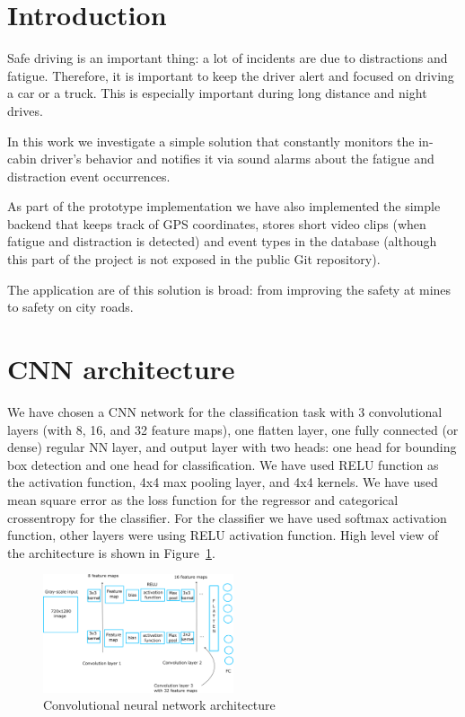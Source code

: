 \section{Introduction}
\label{section:introduction}

Safe driving is an important thing: a lot of incidents are due to 
distractions and fatigue. Therefore, it is important to keep the driver
alert and focused on driving a car or a truck. This is especially important 
during long distance and night drives. 

In this work we investigate a simple solution that constantly monitors 
the in-cabin driver's behavior and notifies it via sound alarms 
about the fatigue and distraction event occurrences. 

As part of the prototype implementation we have also implemented 
the simple backend that keeps track of GPS coordinates, stores 
short video clips (when fatigue and distraction is detected) and event types
in the database (although this part of the project is not exposed in the public 
Git repository).

The application are of this solution is broad: from improving the 
safety at mines to safety on city roads.

\section{CNN architecture}
\label{section:arch}

We have chosen a CNN network for the classification task with 3 convolutional 
layers (with 8, 16, and 32 feature maps), one flatten layer, one fully 
connected (or dense) regular NN layer, and output layer with two heads: one head for 
bounding box detection and one head for classification. We have used RELU function 
as the activation function, 4x4 max pooling layer, and 4x4 kernels. We have used 
mean square error as the loss function for the regressor and categorical crossentropy
for the classifier. For the classifier we have used softmax activation function, other 
layers were using RELU activation function. High level view of the architecture 
is shown in Figure~\ref{fig:arch}.

\begin{figure}[ht!]
    \includegraphics[width=0.5\textwidth]{graphics/cnn.png}
    \caption{Convolutional neural network architecture}
    \label{fig:arch}
    \end{figure}

